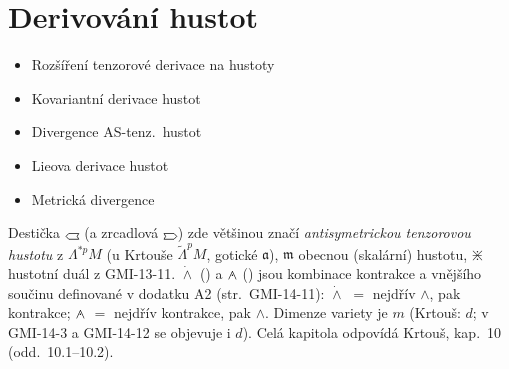 \providecommand{\gmIhustsym}{\mathord{\text{\tikz[baseline=0.04cm,line width=0.55pt,line join=round]{\draw (0,0.075)--(0.07,0.15)--(0.32,0.15)--(0.28,0.075)--(0.32,0)--(0.07,0)--cycle;}}}}
\providecommand{\gmIhustsymB}{\mathord{\text{\tikz[baseline=0.04cm,line width=0.55pt,line join=round]{\draw (0.32,0.075)--(0.25,0.15)--(0,0.15)--(0.04,0.075)--(0,0)--(0.25,0)--cycle;}}}}
\providecommand{\gmIhdual}{\mathord{\divideontimes}}
\providecommand{\gmIdotwedge}{\mathbin{\dot\wedge}}
\providecommand{\gmIwedgedot}{\mathbin{\ooalign{$\wedge$\cr\hidewidth\raisebox{0.1ex}{$\cdot$}\hidewidth\cr}}}

\section{Derivování hustot}

\begin{itemize}[nosep]
  \item Rozšíření tenzorové derivace na hustoty
  \item Kovariantní derivace hustot
  \item Divergence AS-tenz.\ hustot
  \item Lieova derivace hustot
  \item Metrická divergence
\end{itemize}

\begin{vysvetleni}
Destička $\gmIhustsym$ (a zrcadlová $\gmIhustsymB$) zde většinou značí \emph{antisymetrickou tenzorovou hustotu} z $\Lambda^{*p}M$
(u Krtouše $\tilde\Lambda^pM$, gotické $\mathfrak a$), $\mathfrak m$ obecnou (skalární) hustotu, $\gmIhdual$ hustotní duál z GMI-13-11.
$\gmIdotwedge$ () a $\gmIwedgedot$ () jsou kombinace kontrakce a vnějšího součinu
definované v dodatku A2 (str.~GMI-14-11): $\gmIdotwedge$ $=$ nejdřív $\wedge$, pak kontrakce; $\gmIwedgedot$ $=$ nejdřív kontrakce, pak $\wedge$.
Dimenze variety je $m$ (Krtouš: $d$; v GMI-14-3 a GMI-14-12 se objevuje i $d$). Celá kapitola odpovídá Krtouš, kap.~10 (odd.~10.1--10.2).
\end{vysvetleni}

\newpage
{}
